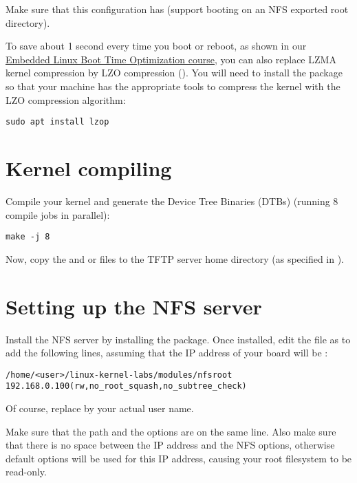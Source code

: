Make sure that this configuration has  (support
booting on an NFS exported root directory).

To save about 1 second every time you boot or reboot, as shown in our
\href{https://bootlin.com/training/boot-time}{Embedded Linux Boot Time
  Optimization course}, you can also replace LZMA kernel compression
by LZO compression (). You will need to
install the  package so that your machine has the
appropriate tools to compress the kernel with the LZO compression
algorithm:

\begin{verbatim}
sudo apt install lzop
\end{verbatim}

\section{Kernel compiling}

Compile your kernel and generate the Device Tree Binaries (DTBs)
(running 8 compile jobs in parallel):

\begin{verbatim}
make -j 8
\end{verbatim}

Now, copy the  and 
or  files
to the TFTP server home directory (as specified in ).

\section{Setting up the NFS server}

Install the NFS server by installing the 
package. Once installed, edit the  file as
 to add the following lines, assuming that the IP address
of your board will be :

\scriptsize
\begin{verbatim}
/home/<user>/linux-kernel-labs/modules/nfsroot 192.168.0.100(rw,no_root_squash,no_subtree_check)
\end{verbatim}
\normalsize

Of course, replace  by your actual user name.

Make sure that the path and the options are on the same line.
Also make sure that there is no space between the IP address and the NFS
options, otherwise default options will be used for this IP address,
causing your root filesystem to be read-only.

